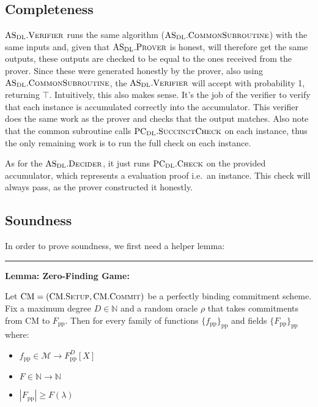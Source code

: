 \documentclass[
]{article}
\providecommand{\tightlist}{%
  \setlength{\itemsep}{0pt}\setlength{\parskip}{0pt}}
\newcommand*\Nb{\mathbb{N}}
\newcommand*\Mc{\mathcal{M}}
\renewcommand*\l{\lambda}
\newcommand*{\pp}{\mathrm{pp}}
\newcommand*{\Setup}{\mathrm{\text{S{\scriptsize ETUP}}}}
\newcommand*{\Commit}{\mathrm{\text{C{\scriptsize OMMIT}}}}
\newcommand*{\PCDL}{\text{PC}_{\text{DL}}}
\newcommand*{\PCDLSuccinctCheck}{\PCDL.\mathrm{\text{S{\scriptsize UCCINCT}C{\scriptsize HECK}}}}
\newcommand*{\PCDLCheck}{\PCDL.\mathrm{\text{C\scriptsize HECK}}}
\newcommand*{\ASDL}{\text{AS}_{\text{DL}}}
\newcommand*{\ASDLCommonSubroutine}{\ASDL.\mathrm{\text{C{\scriptsize OMMON}S{\scriptsize UBROUTINE}}}}
\newcommand*{\ASDLProver}{\ASDL.\mathrm{\text{P\scriptsize ROVER}}}
\newcommand*{\ASDLVerifier}{\ASDL.\mathrm{\text{V\scriptsize ERIFIER}}}
\newcommand*{\ASDLDecider}{\ASDL.\mathrm{\text{D\scriptsize ECIDER}}}
\newcommand*{\CM}{\mathrm{\text{CM}}}
\newcommand*{\CMSetup}{\CM.\Setup}
\newcommand*{\CMCommit}{\CM.\Commit}
\begin{document}
\begin{quote}
\end{quote}

\subsection{Completeness}\label{completeness-1}

\(\ASDLVerifier\) runs the same algorithm (\(\ASDLCommonSubroutine\))
with the same inputs and, given that \(\ASDLProver\) is honest, will
therefore get the same outputs, these outputs are checked to be equal to
the ones received from the prover. Since these were generated honestly
by the prover, also using \(\ASDLCommonSubroutine\), the
\(\ASDLVerifier\) will accept with probability 1, returning \(\top\).
Intuitively, this also makes sense. It's the job of the verifier to
verify that each instance is accumulated correctly into the accumulator.
This verifier does the same work as the prover and checks that the
output matches. Also note that the common subroutine calls
\(\PCDLSuccinctCheck\) on each instance, thus the only remaining work is
to run the full check on each instance.

As for the \(\ASDLDecider\), it just runs \(\PCDLCheck\) on the provided
accumulator, which represents a evaluation proof i.e.~an instance. This
check will always pass, as the prover constructed it honestly.

\subsection{Soundness}\label{soundness}

In order to prove soundness, we first need a helper lemma:

\begin{center}\rule{0.5\linewidth}{0.5pt}\end{center}

\textbf{Lemma: Zero-Finding Game:}

Let \(\CM = (\CMSetup, \CMCommit)\) be a perfectly binding commitment
scheme. Fix a maximum degree \(D \in \Nb\) and a random oracle \(\rho\)
that takes commitments from \(\CM\) to \(F_\pp\). Then for every family
of functions \(\{f_\pp\}_\pp\) and fields \(\{F_\pp\}_\pp\) where:

\begin{itemize}
\tightlist
\item
  \(f_\pp \in \Mc \to F_\pp^D[X]\)
\item
  \(F \in \Nb \to \Nb\)
\item
  \(|F_\pp| \geq F(\l)\)
\end{itemize}
\end{document}
